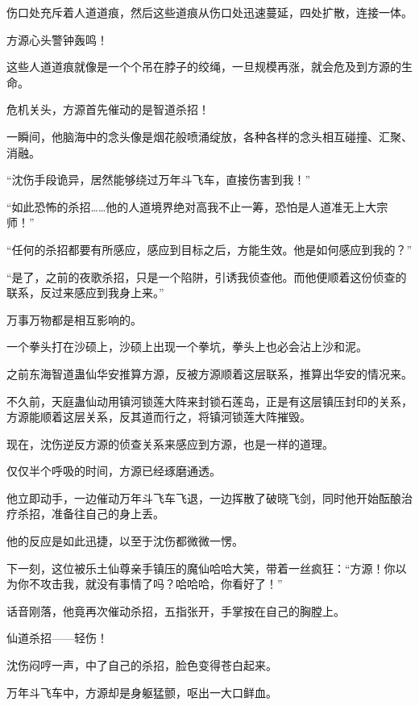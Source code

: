 \begin{this_body}
伤口处充斥着人道道痕，然后这些道痕从伤口处迅速蔓延，四处扩散，连接一体。

方源心头警钟轰鸣！

这些人道道痕就像是一个个吊在脖子的绞绳，一旦规模再涨，就会危及到方源的生命。

危机关头，方源首先催动的是智道杀招！

一瞬间，他脑海中的念头像是烟花般喷涌绽放，各种各样的念头相互碰撞、汇聚、消融。

“沈伤手段诡异，居然能够绕过万年斗飞车，直接伤害到我！”

“如此恐怖的杀招……他的人道境界绝对高我不止一筹，恐怕是人道准无上大宗师！”

“任何的杀招都要有所感应，感应到目标之后，方能生效。他是如何感应到我的？”

“是了，之前的夜歌杀招，只是一个陷阱，引诱我侦查他。而他便顺着这份侦查的联系，反过来感应到我身上来。”

万事万物都是相互影响的。

一个拳头打在沙硕上，沙硕上出现一个拳坑，拳头上也必会沾上沙和泥。

之前东海智道蛊仙华安推算方源，反被方源顺着这层联系，推算出华安的情况来。

不久前，天庭蛊仙动用镇河锁莲大阵来封锁石莲岛，正是有这层镇压封印的关系，方源能顺着这层关系，反其道而行之，将镇河锁莲大阵摧毁。

现在，沈伤逆反方源的侦查关系来感应到方源，也是一样的道理。

仅仅半个呼吸的时间，方源已经琢磨通透。

他立即动手，一边催动万年斗飞车飞退，一边挥散了破晓飞剑，同时他开始酝酿治疗杀招，准备往自己的身上丢。

他的反应是如此迅捷，以至于沈伤都微微一愣。

下一刻，这位被乐土仙尊亲手镇压的魔仙哈哈大笑，带着一丝疯狂：“方源！你以为你不攻击我，就没有事情了吗？哈哈哈，你看好了！”

话音刚落，他竟再次催动杀招，五指张开，手掌按在自己的胸膛上。

仙道杀招——轻伤！

沈伤闷哼一声，中了自己的杀招，脸色变得苍白起来。

万年斗飞车中，方源却是身躯猛颤，呕出一大口鲜血。

\end{this_body}

